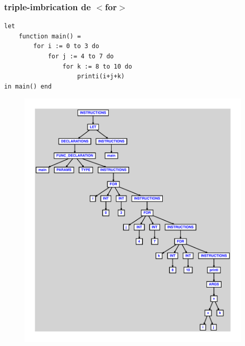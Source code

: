 \documentclass{article}
\begin{document}
\subsubsection{triple-imbrication de $ < $for$ > $}
\begin{lstlisting}
let
	function main() =
		for i := 0 to 3 do
			for j := 4 to 7 do
				for k := 8 to 10 do
					printi(i+j+k)
in main() end
\end{lstlisting}
\newpage
\begin{figure}[H]
\centering
\includegraphics[max width=\textwidth]{ast/ast_210.pdf}
\end{figure}
\newpage
\end{document}
